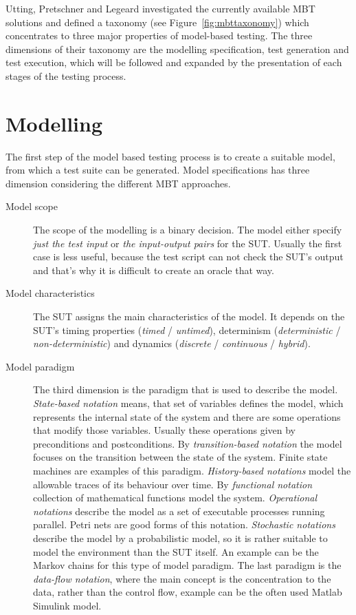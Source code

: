 Utting, Pretschner and Legeard investigated the currently available MBT solutions and defined a taxonomy (see Figure~\ref{fig:mbttaxonomy}) which concentrates to three major properties of model-based testing. The three dimensions of their taxonomy are the modelling specification, test generation and test execution, which will be followed and expanded by the presentation of each stages of the testing process.

\section{Modelling}
\label{sec:modelling}

The first step of the model based testing process is to create a suitable model, from which a test suite can be generated.  Model specifications has three dimension considering the different MBT approaches.

\begin{description}
	\item[Model scope] The scope of the modelling is a binary decision. The model either specify \textit{just the test input} or \textit{the input-output pairs} for the SUT. Usually the first case is less useful, because the test script can not check the SUT's output and that's why it is difficult to create an oracle that way.
	
	\item[Model characteristics] The SUT assigns the main characteristics of the model. It depends on the SUT's timing properties (\textit{timed} / \textit{untimed}), determinism (\textit{deterministic} / \textit{non-deterministic}) and dynamics (\textit{discrete} / \textit{continuous} / \textit{hybrid}).
	
	\item[Model paradigm] The third dimension is the paradigm that is used to describe the model. \textit{State-based notation} means, that set of variables defines the model, which represents the internal state of the system and there are some operations that modify those variables. Usually these operations given by preconditions and postconditions. By \textit{transition-based notation} the model focuses on the transition between the state of the system. Finite state machines are examples of this paradigm. \textit{History-based notations} model the allowable traces of its behaviour over time. By \textit{functional notation} collection of mathematical functions model the system. \textit{Operational notations} describe the model as a set of executable processes running parallel. Petri nets are good forms of this notation. \textit{Stochastic notations} describe the model by a probabilistic model, so it is rather suitable to model the environment than the SUT itself. An example can be the Markov chains for this type of model paradigm. The last paradigm is the \textit{data-flow notation}, where the main concept is the concentration to the data, rather than the control flow, example can be the often used Matlab Simulink model.
\end{description}

